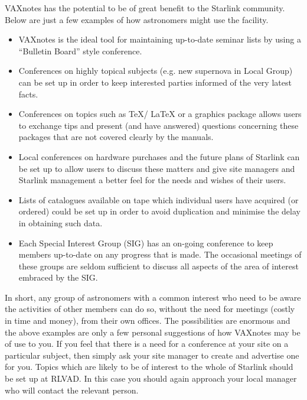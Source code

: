 VAXnotes has the potential to be of great benefit to the Starlink community.
Below are just a few examples of how astronomers might use the facility.

\begin{itemize}

\item VAXnotes is the ideal tool for maintaining up-to-date seminar lists by
using a ``Bulletin Board'' style conference.

\item Conferences on highly topical subjects (e.g. new supernova in Local Group)
can be set up in  order to keep interested parties informed of the very latest
facts.

\item Conferences on topics such as \TeX / \LaTeX { } or a graphics package
allows users to exchange tips and present (and have answered) questions
concerning these packages that are not covered clearly by the manuals.

\item Local conferences on hardware purchases and the future plans of Starlink
can be set up to allow users to discuss these matters and give site managers
and Starlink management a better feel for the needs and wishes of their users.

\item Lists of catalogues available on tape which individual users have
acquired (or ordered) could be set up in order to avoid duplication and
minimise the delay in obtaining such data.

\item Each Special Interest Group (SIG) has an on-going conference to keep
members up-to-date on any progress that is made. The occasional meetings of
these groups are seldom sufficient to discuss all aspects of the area of
interest embraced by the SIG.

\end{itemize}

In short, any group of astronomers with a common interest who need to be aware
the activities of other members can do so, without the need for meetings
(costly in time and money), from their own offices. The possibilities
are enormous and the above examples are only a few personal suggestions of how
VAXnotes may be of use to you. If you feel that there is a need for a
conference at your site on a particular subject, then simply ask your site
manager to create and advertise one for you. Topics which are likely to be of
interest to the whole of Starlink should be set up at RLVAD. In this case you
should again approach your local manager who will contact the relevant person.


